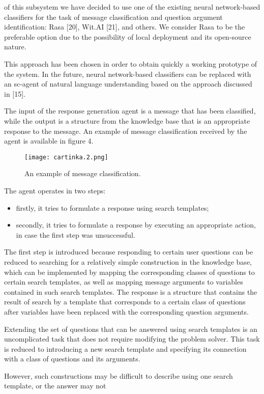 \documentclass[twocolumn]{scndocument}
\begin{document}
of this subsystem we have decided to use one of the
existing neural network-based classifiers for the task of
message classification and question argument identification: Rasa [20], Wit.AI [21], and others. We consider
\newpage \noindent Rasa to be the preferable option due to the possibility of
local deployment and its open-source nature.
\par This approach has been chosen in order to obtain
quickly a working prototype of the system. In the future,
neural network-based classifiers can be replaced with an
sc-agent of natural language understanding based on the
approach discussed in [15].
\par The input of the response generation agent is a message that has been classified, while the output is a
structure from the knowledge base that is an appropriate
response to the message. An example of message classification received by the agent is available in figure 4.
\begin{figure}[H]
  \texttt{[image: cartinka.2.png]}
  \caption{ An example of message classification.}
\end{figure}
\par  The agent operates in two steps:
\begin{itemize}
  \item firstly, it tries to formulate a response using search
templates;
 \item   secondly, it tries to formulate a response by executing an appropriate action, in case the first step was
unsuccessful.
\end{itemize}
\par The first step is introduced because responding to
certain user questions can be reduced to searching for
a relatively simple construction in the knowledge base,
which can be implemented by mapping the corresponding classes of questions to certain search templates,
as well as mapping message arguments to variables
contained in such search templates. The response is a
structure that contains the result of search by a template
that corresponds to a certain class of questions after
variables have been replaced with the corresponding
question arguments.
\par Extending the set of questions that can be answered
using search templates is an uncomplicated task that
does not require modifying the problem solver. This task
is reduced to introducing a new search template and
\newpage \noindent specifying its connection with a class of questions and
its arguments.
\par However, such constructions may be difficult to describe using one search template, or the answer may not
\end{document}
